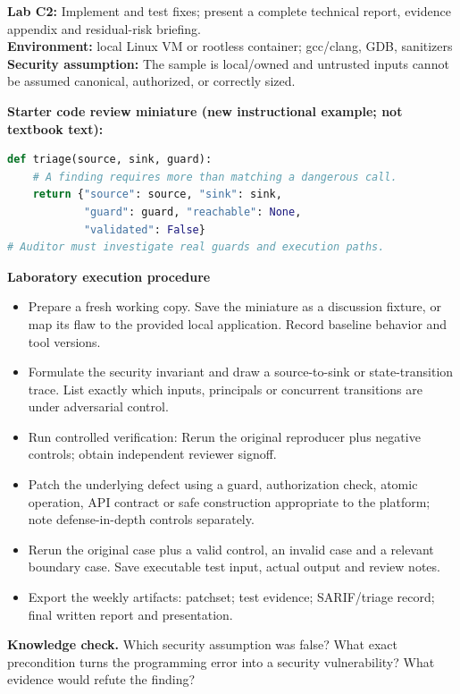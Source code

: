 \documentclass[10pt,letterpaper]{article}
\begin{document}
\begin{insight}\textbf{Lab C2:} Implement and test fixes; present a complete technical report, evidence appendix and residual-risk briefing.\\\textbf{Environment:} local Linux VM or rootless container; gcc/clang, GDB, sanitizers\\\textbf{Security assumption:} The sample is local/owned and untrusted inputs cannot be assumed canonical, authorized, or correctly sized.\end{insight}
\textbf{Starter code review miniature (new instructional example; not textbook text):}
\begin{lstlisting}[language=Python]
def triage(source, sink, guard):
    # A finding requires more than matching a dangerous call.
    return {"source": source, "sink": sink,
            "guard": guard, "reachable": None,
            "validated": False}
# Auditor must investigate real guards and execution paths.
\end{lstlisting}
\textbf{Laboratory execution procedure}
\begin{itemize}[leftmargin=*,itemsep=2pt]
\item Prepare a fresh working copy. Save the miniature as a discussion fixture, or map its flaw to the provided local application. Record baseline behavior and tool versions.
\item Formulate the security invariant and draw a source-to-sink or state-transition trace. List exactly which inputs, principals or concurrent transitions are under adversarial control.
\item Run controlled verification: Rerun the original reproducer plus negative controls; obtain independent reviewer signoff.
\item Patch the underlying defect using a guard, authorization check, atomic operation, API contract or safe construction appropriate to the platform; note defense-in-depth controls separately.
\item Rerun the original case plus a valid control, an invalid case and a relevant boundary case. Save executable test input, actual output and review notes.
\item Export the weekly artifacts: patchset; test evidence; SARIF/triage record; final written report and presentation.
\end{itemize}
\textbf{Knowledge check.} Which security assumption was false? What exact precondition turns the programming error into a security vulnerability? What evidence would refute the finding?
\end{document}
